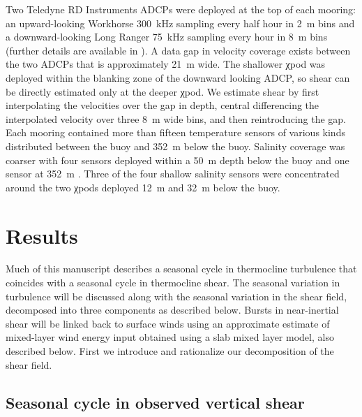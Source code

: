 \documentclass[onecol]{ametsoc}
\begin{document}
Two Teledyne RD Instruments ADCPs were deployed at the top of each mooring: an upward-looking Workhorse \SI{300}{kHz} sampling every half hour in \SI{2}{m} bins and a downward-looking Long Ranger \SI{75}{kHz} sampling every hour in \SI{8}{m} bins (further details are available in \citealp{Wijesekera2016a}).
A data gap in velocity coverage exists between the two ADCPs that is approximately \SI{21}{m} wide.
The shallower χpod was deployed within the blanking zone of the downward looking ADCP, so shear can be directly estimated only at the deeper χpod.
We estimate shear by first interpolating the velocities over the gap in depth, central differencing the interpolated velocity over three \SI{8}{m} wide bins, and then reintroducing the gap.
Each mooring contained more than fifteen temperature sensors of various kinds distributed between the buoy and \SI{352}{m} below the buoy.
Salinity coverage was coarser with four sensors deployed within a \SI{50}{m} depth below the buoy and one sensor at \SI{352}{m} \citep{Wijesekera2016a}.
Three of the four shallow salinity sensors were concentrated around the two χpods deployed \SI{12}{m} and \SI{32}{m} below the buoy.

\section{Results}
\label{sec:results}

Much of this manuscript describes a seasonal cycle in thermocline turbulence that coincides with a seasonal cycle in thermocline shear.
The seasonal variation in turbulence will be discussed along with the seasonal variation in the shear field, decomposed into three components as described below.
Bursts in near-inertial shear will be linked back to surface winds using an approximate estimate of mixed-layer wind energy input obtained using a slab mixed layer model, also described below.
First we introduce and rationalize our decomposition of the shear field.

\subsection{Seasonal cycle in observed vertical shear}
\label{sec:shear}
\end{document}
